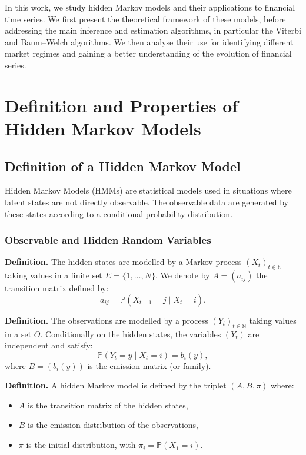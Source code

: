 \documentclass[11pt]{article}
\begin{document}
In this work, we study hidden Markov models and their applications to financial time series. We first present the theoretical framework of these models, before addressing the main inference and estimation algorithms, in particular the Viterbi and Baum--Welch algorithms. We then analyse their use for identifying different market regimes and gaining a better understanding of the evolution of financial series.

\newpage

\section{Definition and Properties of Hidden Markov Models}

\subsection{Definition of a Hidden Markov Model}

Hidden Markov Models (HMMs) are statistical models used in situations where latent states are not directly observable. The observable data are generated by these states according to a conditional probability distribution.

\subsubsection{Observable and Hidden Random Variables}

\textbf{Definition.} 
The hidden states are modelled by a Markov process $(X_t)_{t \in \mathbb{N}}$ taking values in a finite set $E  = \{1,\dots,N\}$. 
We denote by $A = (a_{ij})$ the transition matrix defined by:
\[
a_{ij} = \mathbb{P}(X_{t+1} = j \mid X_t = i).
\]

\vspace{0.3cm}

\textbf{Definition.} 
The observations are modelled by a process $(Y_t)_{t \in \mathbb{N}}$ taking values in a set $O$. 
Conditionally on the hidden states, the variables $(Y_t)$ are independent and satisfy:
\[
\mathbb{P}(Y_t = y \mid X_t = i) = b_i(y),
\]
where $B = (b_i(y))$ is the emission matrix (or family).

\vspace{0.3cm}

\textbf{Definition.} 
A hidden Markov model is defined by the triplet $(A, B, \pi)$ where:
\begin{itemize}
    \item $A$ is the transition matrix of the hidden states,
    \item $B$ is the emission distribution of the observations,
    \item $\pi$ is the initial distribution, with $\pi_i = \mathbb{P}(X_1 = i)$.
\end{itemize}
\vspace{0.3cm}
\end{document}

